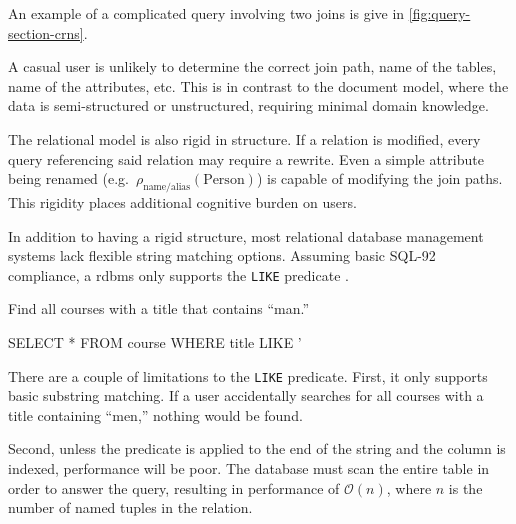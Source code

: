			An example of a complicated query involving two joins is give in \vref{fig:query-section-crns}.
			
			A casual user is unlikely to determine the correct join path, name of the tables, name of the attributes, etc.	This is in contrast to the document model, where the data is semi-structured or unstructured, requiring minimal domain knowledge.

			The relational model is also rigid in structure.  If a relation is modified, every query referencing said relation may require a rewrite.  Even a simple attribute being renamed (e.g.~\(\rho_{\text{name/alias}}(\text{Person})\)) is capable of modifying the join paths.  This rigidity places additional cognitive burden on users.
			
			In addition to having a rigid structure, most relational database management systems lack flexible string matching options.	 Assuming basic SQL-92 compliance, a \gls{rdbms} only supports the \texttt{LIKE} predicate \cite{sql-2011}.
			
			\begin{ex}
				Find all courses with a title that contains ``man.''
				
				\begin{singlespaced}
					\begin{sqlcode}
SELECT *
FROM   course
WHERE  title LIKE '%
					\end{sqlcode}
				\end{singlespaced}
			\end{ex}
			
			There are a couple of limitations to the \texttt{LIKE} predicate.  First, it only supports basic substring matching.  If a user accidentally searches for all courses with a title containing ``men,'' nothing would be found.
			
			Second, unless the predicate is applied to the end of the string and the column is indexed, performance will be poor.  The database must scan the entire table in order to answer the query, resulting in performance of \(\mathcal{O}(n)\), where \(n\) is the number of named tuples in the relation.